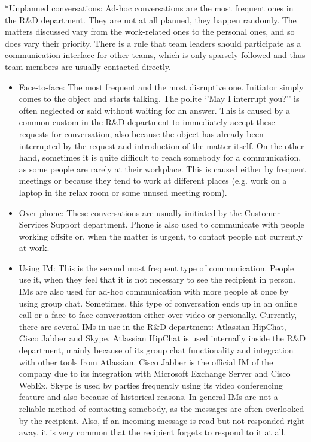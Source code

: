 \documentclass[11pt,singleside]{myfithesis2}
\makeatletter
\renewcommand\paragraph{
   \vspace{-10pt}
   \@startsection{paragraph}{4}{0mm}
      {\baselineskip}
      {- 5pt}
      {\normalfont\normalsize\bfseries}
}
\makeatother
\begin{document}
\paragraph*{Unplanned conversations: } Ad-hoc conversations are the most frequent ones in the R\&D department. They are not at all planned, they happen randomly. The matters discussed vary from the work-related ones to the personal ones, and so does vary their priority. There is a rule that team leaders should participate as a communication interface for other teams, which is only sparsely followed and thus team members are usually contacted directly.
\begin{itemize}
	\item{Face-to-face:} The most frequent and the most disruptive one. Initiator simply comes to the object and starts talking. The polite `'May I interrupt you?'' is often neglected or said without waiting for an answer. This is caused by a common custom in the R\&D department to immediately accept these requests for conversation, also because the object has already been interrupted by the request and introduction of the matter itself. On the other hand, sometimes it is quite difficult to reach somebody for a communication, as some people are rarely at their workplace. This is caused either by frequent meetings or because they tend to work at different places (e.g. work on a laptop in the relax room or some unused meeting room).
	\item{Over phone:} These conversations are usually initiated by the Customer Services Support department. Phone is also used to communicate with people working offsite or, when the matter is urgent, to contact people not currently at work.
	\item{Using IM:} This is the second most frequent type of communication. People use it, when they feel that it is not necessary to see the recipient in person. IMs are also used for ad-hoc communication with more people at once by using group chat. Sometimes, this type of conversation ends up in an online call or a face-to-face conversation either over video or personally.  Currently, there are several IMs in use in the R\&D department: Atlassian HipChat, Cisco Jabber and Skype. Atlassian HipChat is used internally inside the R\&D department, mainly because of its group chat functionality and integration with other tools from Atlassian. Cisco Jabber is the official IM of the company due to its integration with Microsoft Exchange Server and Cisco WebEx. Skype is used by parties frequently using its video conferencing feature and also because of historical reasons. In general IMs are not a reliable method of contacting somebody, as the messages are often overlooked by the recipient. Also, if an incoming message is read but not responded right away, it is very common that the recipient forgets to respond to it at all.
\end{itemize}
\end{document}
